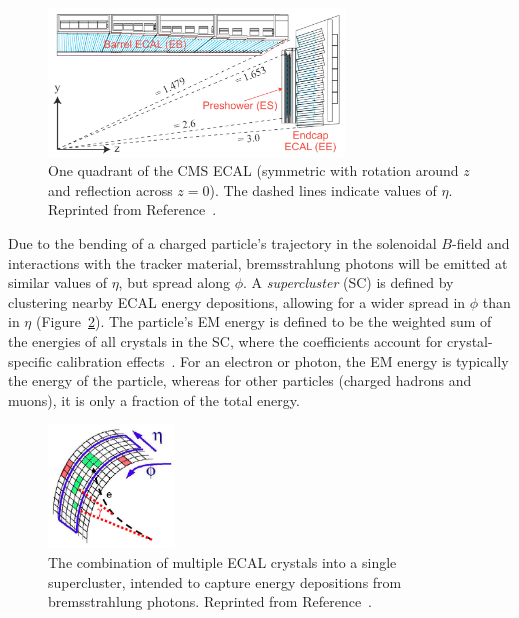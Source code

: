 \begin{figure}[]
    \begin{center} 
        \includegraphics[width=0.7\textwidth]{figures/cms/ecal.png}
        \caption{One quadrant of the CMS ECAL (symmetric with rotation around $z$ and reflection across $z=0$).
                 The dashed lines indicate values of $\eta$.
                 Reprinted from Reference~\cite{cmsecaljinst}.}
        \label{fig:cms:ecal}
    \end{center}
\end{figure}

Due to the bending of a charged particle's trajectory in the solenoidal $B$-field and interactions with the tracker material, bremsstrahlung photons will be emitted at similar values of $\eta$, but spread along $\phi$.
A \emph{supercluster} (SC) is defined by clustering nearby ECAL energy depositions, allowing for a wider spread in $\phi$ than in $\eta$ (Figure~\ref{fig:cms:sc}).
The particle's EM energy is defined to be the weighted sum of the energies of all crystals in the SC, where the coefficients account for crystal-specific calibration effects~\cite{cmsecalreco}.
For an electron or photon, the EM energy is typically the energy of the particle, whereas for other particles (charged hadrons and muons), it is only a fraction of the total energy.

\begin{figure}[]
    \begin{center} 
        \includegraphics[width=0.3\textwidth]{figures/cms/sc.png}
        \caption{The combination of multiple ECAL crystals into a single supercluster, intended to capture energy depositions from bremsstrahlung photons.
                  Reprinted from Reference~\cite{cmsecalrev}.}
        \label{fig:cms:sc}
    \end{center}
\end{figure}

